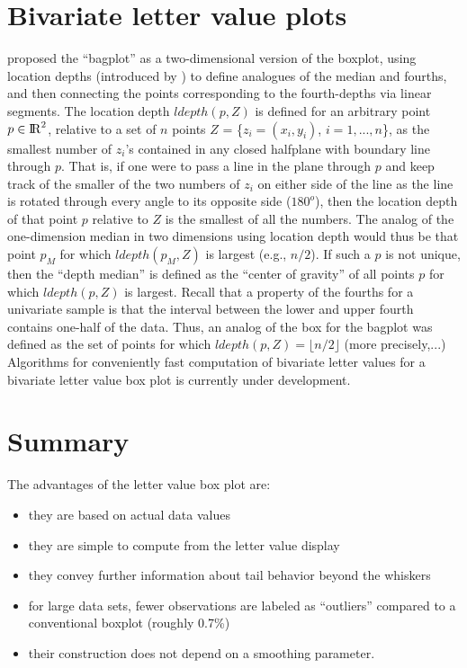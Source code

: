 \documentclass[oneside]{article}
\newcommand{\Reals}{{\rm I\kern-.1667em{}R}}
\begin{document}
\section{Bivariate letter value plots}
\label{sec:bivariate}

\citet{bagplots} proposed the ``bagplot'' as a two-dimensional version of the boxplot, using location depths (introduced by \citet{tukey75}) to define analogues of the median and fourths, and then connecting the points corresponding to the fourth-depths via linear segments. The location depth $ldepth(p,Z)$ is defined for an arbitrary point $p \in \Reals^2$, relative to a set of $n$ points $Z$ = \{$z_i = (x_i, y_i)$, $i = 1,...,n$\}, as the smallest number of $z_i$'s contained in any closed halfplane with boundary line through $p$. That is, if one were to pass a line in the plane through $p$ and keep track of the smaller of the two numbers of $z_i$ on either side of the line as the line is rotated through every angle to its opposite side ($180^o$), then the location depth of that point $p$ relative to $Z$ is the smallest of all the numbers. The analog of the one-dimension median in two dimensions using location depth would thus be that point $p_M$ for which $ldepth(p_M, Z)$ is largest (e.g., $n/2$). If such a $p$ is not unique, then the ``depth median'' is defined as the ``center of gravity'' of all points $p$ for which $ldepth(p,Z)$ is largest. Recall that a property of the fourths for a univariate sample is that the interval between the lower and upper fourth contains one-half of the data. Thus, an analog of the box for the bagplot was defined as the set of points for which $ldepth(p,Z) = \lfloor n/2 \rfloor$ (more precisely,...) Algorithms for conveniently fast computation of bivariate letter values for a bivariate letter value box plot is currently under development.

\section{Summary}
\label{sec:summary}

The advantages of the letter value box plot are:

\begin{itemize}
\item they are based on actual data values 
\item they are simple to compute from the letter value display
\item they convey further information about tail behavior beyond the whiskers
\item for large data sets, fewer observations are labeled as ``outliers'' 
compared to a conventional boxplot (roughly 0.7\%)
\item their construction does not depend on a smoothing parameter.
\end{itemize} 
\end{document}
